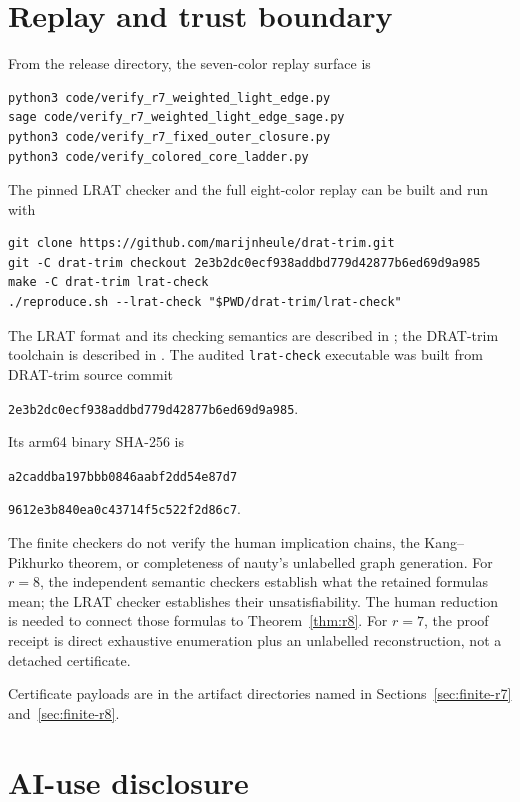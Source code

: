 \documentclass[11pt,reqno,a4paper]{amsart}
\theoremstyle{definition}
\theoremstyle{remark}
\begin{document}
\section{Replay and trust boundary}\label{sec:replay}

From the  release directory, the seven-color replay surface is
{\small\begin{verbatim}
python3 code/verify_r7_weighted_light_edge.py
sage code/verify_r7_weighted_light_edge_sage.py
python3 code/verify_r7_fixed_outer_closure.py
python3 code/verify_colored_core_ladder.py
\end{verbatim}}
The pinned LRAT checker and the full eight-color replay can be built and run
with
{\small\begin{verbatim}
git clone https://github.com/marijnheule/drat-trim.git
git -C drat-trim checkout 2e3b2dc0ecf938addbd779d42877b6ed69d9a985
make -C drat-trim lrat-check
./reproduce.sh --lrat-check "$PWD/drat-trim/lrat-check"
\end{verbatim}}

The LRAT format and its checking semantics are described in
\cite{CruzFilipeEtAl2017}; the DRAT-trim toolchain is described in
\cite{WetzlerHeuleHunt2014}. The audited \texttt{lrat-check} executable was
built from DRAT-trim source commit
\begin{center}
\texttt{2e3b2dc0ecf938addbd779d42877b6ed69d9a985}.
\end{center}
Its arm64 binary SHA-256 is
\begin{center}
\texttt{a2caddba197bbb0846aabf2dd54e87d7}\par\vspace{-2pt}
\texttt{9612e3b840ea0c43714f5c522f2d86c7}.
\end{center}

The finite checkers do not verify the human implication chains, the
Kang--Pikhurko theorem, or completeness of nauty's unlabelled graph
generation. For $r=8$, the independent semantic checkers establish what
the retained formulas mean; the LRAT checker establishes their
unsatisfiability. The human reduction is needed to connect those formulas
to Theorem~\ref{thm:r8}. For $r=7$, the proof receipt is direct exhaustive
enumeration plus an unlabelled reconstruction, not a detached certificate.

Certificate payloads are in the artifact directories named in
Sections~\ref{sec:finite-r7} and~\ref{sec:finite-r8}.

\section{AI-use disclosure}\label{sec:ai-disclosure}
\end{document}
